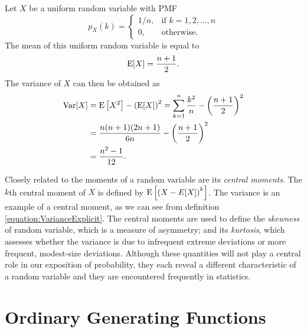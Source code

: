 \begin{example}
Let $X$ be a uniform random variable with PMF
\begin{equation*}
p_X (k) = \left\{ \begin{array}{ll}
1/n, & \text{if }k = 1, 2, \ldots, n \\
0, & \text{otherwise} .
\end{array} \right.
\end{equation*}
The mean of this uniform random variable is equal to
\begin{equation*}
\mathrm{E} [X] = \frac{n+1}{2} .
\end{equation*}
The variance of $X$ can then be obtained as
\begin{equation*}
\begin{split}
\mathrm{Var} [X] &= \mathrm{E} \left[ X^2 \right] - \left( \mathrm{E} [X] \right)^2
= \sum_{k=1}^n \frac{k^2}{n} - \left( \frac{n+1}{2} \right)^2 \\
&= \frac{n(n+1)(2n+1)}{6n} - \left( \frac{n+1}{2} \right)^2 \\
&= \frac{n^2 - 1}{12} .
\end{split}
\end{equation*}
\end{example}

Closely related to the moments of a random variable are its \emph{central moments}. 
The $k$th central moment of $X$ is defined by $\mathrm{E} \left[ \left( X - E[X] \right)^k \right]$.
The variance is an example of a central moment, as we can see from definition \eqref{equation:VarianceExplicit}.
The central moments are used to define the \emph{skewness} of random variable, which is a measure of asymmetry; and its \emph{kurtosis}, which assesses whether the variance is due to infrequent extreme deviations or more frequent, modest-size deviations.
Although these quantities will not play a central role in our exposition of probability, they each reveal a different characteristic of a random variable and they are encountered frequently in statistics. 


\section{Ordinary Generating Functions}
\label{section:OrdinaryGeneratingFunctions}

